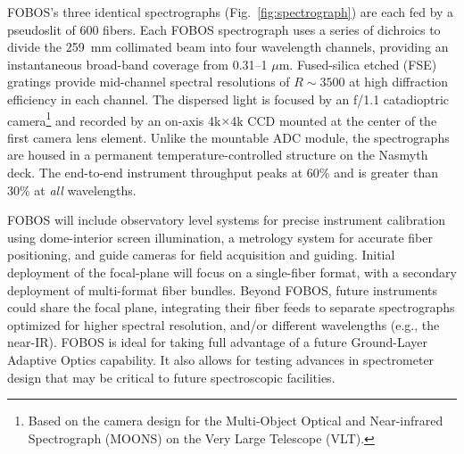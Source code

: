 FOBOS's three identical spectrographs (Fig.~\ref{fig:spectrograph})
are each fed by a pseudoslit of 600 fibers. Each FOBOS spectrograph
uses a series of dichroics to divide the 259~mm collimated beam into
four wavelength channels, providing an instantaneous broad-band
coverage from 0.31--1 $\mu$m. Fused-silica etched (FSE) gratings
provide mid-channel spectral resolutions of $R\sim3500$ at high
diffraction efficiency in each channel. The dispersed light is
focused by an f/1.1 catadioptric camera\footnote{Based on the camera
design for the Multi-Object Optical and Near-infrared Spectrograph
(MOONS) on the Very Large Telescope (VLT).} and recorded by an
on-axis 4k$\times$4k CCD mounted at the center of the first camera
lens element. Unlike the mountable ADC module, the spectrographs are
housed in a permanent temperature-controlled structure on the Nasmyth
deck. The end-to-end instrument throughput peaks at 60\% and is
greater than 30\% at {\it all} wavelengths.

FOBOS will include observatory level systems for precise instrument
calibration using dome-interior screen illumination, a metrology system
for accurate fiber positioning, and guide cameras for field acquisition
and guiding.  Initial deployment of the focal-plane will focus on a
single-fiber format, with a secondary deployment of multi-format fiber
bundles.  Beyond FOBOS, future instruments could share the focal plane, integrating their
fiber feeds to separate spectrographs optimized for higher spectral resolution, and/or
different wavelengths (e.g., the near-IR).  FOBOS is ideal for taking full advantage of a future
Ground-Layer Adaptive Optics capability.  It also allows for testing advances in spectrometer design that may be critical to future spectroscopic facilities.

